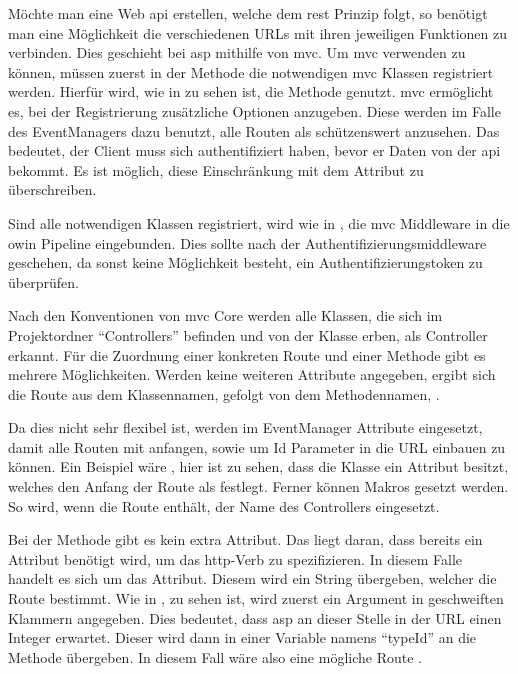 
Möchte man eine Web \gls{api} erstellen, welche dem \gls{rest} Prinzip folgt, so benötigt man eine Möglichkeit die verschiedenen URLs mit ihren jeweiligen Funktionen zu verbinden. Dies geschieht bei \gls{asp} mithilfe von \gls{mvc}. Um \gls{mvc} verwenden zu können, müssen zuerst in der  Methode die notwendigen \gls{mvc} Klassen registriert werden. Hierfür wird, wie in  zu sehen ist, die Methode  genutzt. \gls{mvc} ermöglicht es, bei der Registrierung zusätzliche Optionen anzugeben. Diese werden im Falle des EventManagers dazu benutzt, alle Routen als schützenswert anzusehen. Das bedeutet, der Client muss sich authentifiziert haben, bevor er Daten von der \gls{api} bekommt. Es ist möglich, diese Einschränkung mit dem Attribut \lstcode{[AllowAnonymous]} zu überschreiben.


Sind alle notwendigen Klassen registriert, wird wie in , die \gls{mvc} Middleware in die \gls{owin} Pipeline eingebunden. Dies sollte nach der Authentifizierungsmiddleware geschehen, da sonst keine Möglichkeit besteht, ein Authentifizierungstoken zu überprüfen.

Nach den Konventionen von \gls{mvc} Core werden alle Klassen, die sich im Projektordner \enquote{Controllers} befinden und von der  Klasse erben, als Controller erkannt. Für die Zuordnung einer konkreten Route und einer Methode gibt es mehrere Möglichkeiten. Werden keine weiteren Attribute angegeben, ergibt sich die Route aus dem Klassennamen, gefolgt von dem Methodennamen, \zB {}.

Da dies nicht sehr flexibel ist, werden im EventManager Attribute eingesetzt, damit alle Routen mit  anfangen, sowie um Id Parameter in die URL einbauen zu können. Ein Beispiel wäre , hier ist zu sehen, dass die Klasse ein \lstcode{[Route]} Attribut besitzt, welches den Anfang der Route als  festlegt. Ferner können Makros gesetzt werden. So wird, wenn die Route \lstcode{[controller]} enthält, der Name des Controllers eingesetzt.

Bei der Methode gibt es kein extra \lstcode{[Route]} Attribut. Das liegt daran, dass bereits ein Attribut benötigt wird, um das \gls{http}-Verb zu spezifizieren. In diesem Falle handelt es sich um das \lstcode{[HttpPut]} Attribut. Diesem wird ein String übergeben, welcher die Route bestimmt. Wie in , zu sehen ist, wird zuerst ein Argument in geschweiften Klammern angegeben. Dies bedeutet, dass \gls{asp} an dieser Stelle in der URL einen Integer erwartet. Dieser wird dann in einer Variable namens \enquote{typeId} an die Methode übergeben. In diesem Fall wäre also eine mögliche Route .


